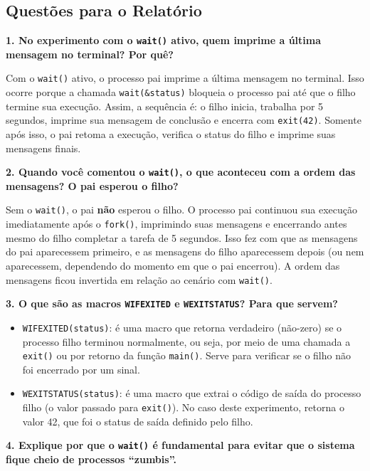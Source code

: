 \documentclass[11pt]{ifscarticle}
\begin{document}
    \subsection{Questões para o Relatório}

    \textbf{1. No experimento com o \texttt{wait()} ativo, quem imprime a última mensagem no terminal? Por quê?}

    Com o \texttt{wait()} ativo, o processo pai imprime a última mensagem no terminal. Isso ocorre porque a chamada \texttt{wait(\&status)} bloqueia o processo pai até que o filho termine sua execução. Assim, a sequência é: o filho inicia, trabalha por 5 segundos, imprime sua mensagem de conclusão e encerra com \texttt{exit(42)}. Somente após isso, o pai retoma a execução, verifica o status do filho e imprime suas mensagens finais.

    \textbf{2. Quando você comentou o \texttt{wait()}, o que aconteceu com a ordem das mensagens? O pai esperou o filho?}

    Sem o \texttt{wait()}, o pai \textbf{não} esperou o filho. O processo pai continuou sua execução imediatamente após o \texttt{fork()}, imprimindo suas mensagens e encerrando antes mesmo do filho completar a tarefa de 5 segundos. Isso fez com que as mensagens do pai aparecessem primeiro, e as mensagens do filho aparecessem depois (ou nem aparecessem, dependendo do momento em que o pai encerrou). A ordem das mensagens ficou invertida em relação ao cenário com \texttt{wait()}.

    \textbf{3. O que são as macros \texttt{WIFEXITED} e \texttt{WEXITSTATUS}? Para que servem?}

    \begin{itemize}
        \item \texttt{WIFEXITED(status)}: é uma macro que retorna verdadeiro (não-zero) se o processo filho terminou normalmente, ou seja, por meio de uma chamada a \texttt{exit()} ou por retorno da função \texttt{main()}. Serve para verificar se o filho não foi encerrado por um sinal.
        \item \texttt{WEXITSTATUS(status)}: é uma macro que extrai o código de saída do processo filho (o valor passado para \texttt{exit()}). No caso deste experimento, retorna o valor 42, que foi o status de saída definido pelo filho.
    \end{itemize}

    \textbf{4. Explique por que o \texttt{wait()} é fundamental para evitar que o sistema fique cheio de processos ``zumbis''.}
\end{document}
